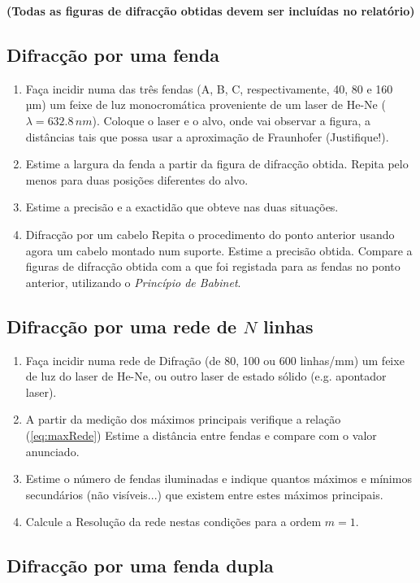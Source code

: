 \documentclass[a4paper,12pt]{article}
\begin{document}
{\bf (Todas as figuras de difracção obtidas devem ser incluídas no relatório)}

\subsection{\sf Difracção por uma fenda}

\begin{enumerate}
\item Faça incidir numa das três fendas (A, B, C, respectivamente, 40, 80 e 160 µm) um 
feixe de luz monocromática proveniente de um laser de He-Ne ($\lambda=632.8\,nm$).  
Coloque o laser e o alvo, onde vai observar a figura, a distâncias tais que possa usar 
a aproximação de Fraunhofer (Justifique!). 
\item Estime a largura da fenda a partir da figura de difracção obtida.  
Repita pelo menos para duas posições diferentes do 
alvo.  
\item Estime a precisão e a exactidão que obteve nas duas situações. 
\item Difracção por um cabelo
Repita  o  procedimento  do  ponto  anterior  usando  agora  um  cabelo  montado  num 
suporte.  
Estime a precisão obtida.  
Compare  a  figuras  de  difracção  obtida  com  a  que  foi  registada  para  as  fendas  no 
ponto anterior, utilizando o \emph{Princípio de Babinet}.
\end{enumerate}

\subsection{\sf Difracção por uma rede de $N$ linhas}
\begin{enumerate}
\item Faça incidir numa rede de Difração (de 80, 100 ou 600 linhas/mm) um 
feixe de luz do laser de He-Ne, ou outro laser de estado sólido (e.g. apontador laser).
\item A partir da medição dos máximos principais verifique a relação  (\ref{eq:maxRede})
Estime a distância entre fendas e compare com o valor anunciado.
\item Estime o número de fendas iluminadas e indique quantos máximos e mínimos secundários (não visíveis...) que existem 
entre estes máximos principais.
\item Calcule a Resolução da rede nestas condições para a ordem $m=1$. 
\end{enumerate}


\subsection{\sf Difracção por uma fenda dupla}
 
\end{document}
